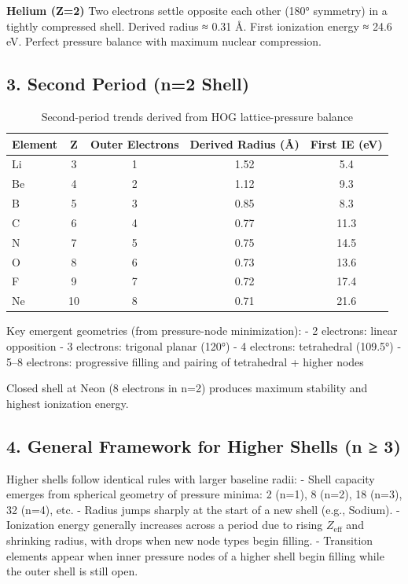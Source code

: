 \documentclass[11pt,a4paper]{book}
\begin{document}
\textbf{Helium (Z=2)}  
Two electrons settle opposite each other (180° symmetry) in a tightly compressed shell.  
Derived radius ≈ 0.31 Å. First ionization energy ≈ 24.6 eV.  
Perfect pressure balance with maximum nuclear compression.

\subsection{3. Second Period (n=2 Shell)}

\begin{table}[h]
\centering
\begin{tabular}{lcccc}
\toprule
Element & Z & Outer Electrons & Derived Radius (Å) & First IE (eV) \\
\midrule
Li & 3 & 1 & 1.52 & 5.4 \\
Be & 4 & 2 & 1.12 & 9.3 \\
B  & 5 & 3 & 0.85 & 8.3 \\
C  & 6 & 4 & 0.77 & 11.3 \\
N  & 7 & 5 & 0.75 & 14.5 \\
O  & 8 & 6 & 0.73 & 13.6 \\
F  & 9 & 7 & 0.72 & 17.4 \\
Ne & 10& 8 & 0.71 & 21.6 \\
\bottomrule
\end{tabular}
\caption{Second-period trends derived from HOG lattice-pressure balance}
\end{table}

Key emergent geometries (from pressure-node minimization):
- 2 electrons: linear opposition
- 3 electrons: trigonal planar (120°)
- 4 electrons: tetrahedral (109.5°)
- 5–8 electrons: progressive filling and pairing of tetrahedral + higher nodes

Closed shell at Neon (8 electrons in n=2) produces maximum stability and highest ionization energy.

\subsection{4. General Framework for Higher Shells (n ≥ 3)}

Higher shells follow identical rules with larger baseline radii:
- Shell capacity emerges from spherical geometry of pressure minima: 2 (n=1), 8 (n=2), 18 (n=3), 32 (n=4), etc.
- Radius jumps sharply at the start of a new shell (e.g., Sodium).
- Ionization energy generally increases across a period due to rising \( Z_{\text{eff}} \) and shrinking radius, with drops when new node types begin filling.
- Transition elements appear when inner pressure nodes of a higher shell begin filling while the outer shell is still open.
\end{document}
